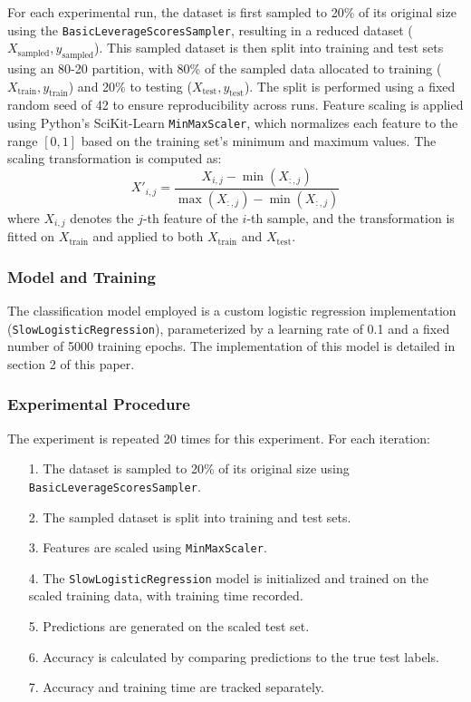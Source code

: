 \documentclass{article}
\theoremstyle{plain}
\theoremstyle{definition}
\theoremstyle{remark}
\begin{document}
For each experimental run, the dataset is first sampled to 20\% of its original size using the \texttt{BasicLeverageScoresSampler}, resulting in a reduced dataset ($ X_{\text{sampled}}, y_{\text{sampled}} $). This sampled dataset is then split into training and test sets using an 80-20 partition, with 80\% of the sampled data allocated to training ($ X_{\text{train}}, y_{\text{train}} $) and 20\% to testing ($ X_{\text{test}}, y_{\text{test}} $). The split is performed using a fixed random seed of 42 to ensure reproducibility across runs. Feature scaling is applied using Python's SciKit-Learn \texttt{MinMaxScaler}, which normalizes each feature to the range $[0, 1]$ based on the training set's minimum and maximum values. The scaling transformation is computed as:
\[
X'_{i,j} = \frac{X_{i,j} - \min(X_{:,j})}{\max(X_{:,j}) - \min(X_{:,j})}
\]
where $ X_{i,j} $ denotes the $ j $-th feature of the $ i $-th sample, and the transformation is fitted on $ X_{\text{train}} $ and applied to both $ X_{\text{train}} $ and $ X_{\text{test}} $.

\subsubsection{Model and Training}

The classification model employed is a custom logistic regression implementation (\texttt{SlowLogisticRegression}), parameterized by a learning rate of 0.1 and a fixed number of 5000 training epochs. The implementation of this model is detailed in section 2 of this paper.

\subsubsection{Experimental Procedure}

The experiment is repeated 20 times for this experiment. For each iteration:

\begin{itemize}
 \item [1.] The dataset is sampled to 20\% of its original size using \texttt{BasicLeverageScoresSampler}.
 \item [2.] The sampled dataset is split into training and test sets.
 \item [3.] Features are scaled using \texttt{MinMaxScaler}.
 \item [4.] The \texttt{SlowLogisticRegression} model is initialized and trained on the scaled training data, with training time recorded.
 \item [5.] Predictions are generated on the scaled test set.
 \item [6.] Accuracy is calculated by comparing predictions to the true test labels.
 \item [7.] Accuracy and training time are tracked separately.
\end{itemize}
\end{document}
